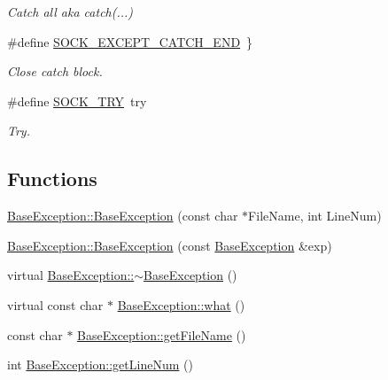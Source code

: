 \begin{DoxyCompactItemize}
\begin{DoxyCompactList}\small\item\em Catch all aka catch(...) \end{DoxyCompactList}\item 
\#define \hyperlink{group__EXCEPT__GROUP_gab02b5874434fbc42da0455c18ca6dc5b}{S\+O\+C\+K\+\_\+\+E\+X\+C\+E\+P\+T\+\_\+\+C\+A\+T\+C\+H\+\_\+\+E\+ND}~\}
\begin{DoxyCompactList}\small\item\em Close catch block. \end{DoxyCompactList}\item 
\#define \hyperlink{group__EXCEPT__GROUP_ga19386f07669ffd0c3c56747e3e5a14a4}{S\+O\+C\+K\+\_\+\+T\+RY}~try
\begin{DoxyCompactList}\small\item\em Try. \end{DoxyCompactList}\end{DoxyCompactItemize}
\subsection*{Functions}
\begin{DoxyCompactItemize}
\item 
\hyperlink{group__EXCEPT__GROUP_ga50ebb96feb32366ffc4e992ae5b95e31}{Base\+Exception\+::\+Base\+Exception} (const char $\ast$File\+Name, int Line\+Num)
\item 
\hyperlink{group__EXCEPT__GROUP_ga7b53cdc179f7919010bd7e22c32081e7}{Base\+Exception\+::\+Base\+Exception} (const \hyperlink{classBaseException}{Base\+Exception} \&exp)
\item 
virtual \hyperlink{group__EXCEPT__GROUP_gabc351b149be47d3e078dc04b9b5c8891}{Base\+Exception\+::$\sim$\+Base\+Exception} ()
\item 
virtual const char $\ast$ \hyperlink{group__EXCEPT__GROUP_gaf092dd6587491cd7a8cdd987597b1018}{Base\+Exception\+::what} ()
\item 
const char $\ast$ \hyperlink{group__EXCEPT__GROUP_gaeea140646898fbe7642cd2dc13b2b22c}{Base\+Exception\+::get\+File\+Name} ()
\item 
int \hyperlink{group__EXCEPT__GROUP_ga70bef940bbfd7bb2cc50b8150e1bded2}{Base\+Exception\+::get\+Line\+Num} ()
\end{DoxyCompactItemize}
